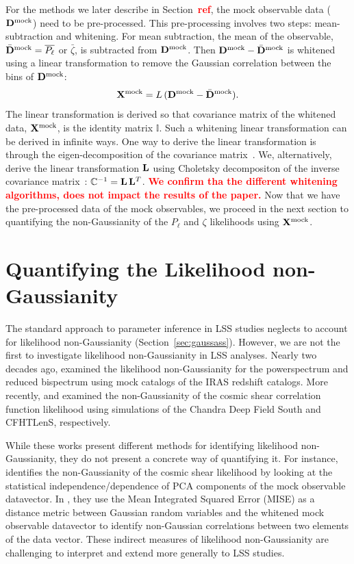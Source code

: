 \documentclass[12pt, letterpaper, preprint]{aastex}
\newcommand{\beq}{\begin{equation}}
\newcommand{\eeq}{\end{equation}}
\newcommand{\todo}[1]{{\bf \textcolor{red}{#1}}}
\newcommand{\Dmock}{{\bf D}^\mathrm{mock}}
\newcommand{\Xmock}{{\bf X}^\mathrm{mock}}
\begin{document}
For the methods we later describe in Section~\todo{ref}, the mock 
observable data ($\Dmock$) need to be pre-processed. This pre-processing
involves two steps: mean-subtraction and whitening. For mean subtraction, 
the mean of the observable, $\bar{\bf D}^\mathrm{mock} = \overline{P_\ell}$ or 
$\bar{\zeta}$, is subtracted from $\Dmock$. Then $\Dmock - \bar{\bf D}^\mathrm{mock}$ 
is whitened using a linear transformation to remove the Gaussian correlation
between the bins of $\Dmock$: 
\beq
\Xmock = L\,(\Dmock - \bar{\bf D}^\mathrm{mock}). 
\eeq
The linear transformation is derived so that covariance matrix of the whitened 
data, $\Xmock$, is the identity matrix $\mathbb{I}$. Such a whitening linear 
transformation can be derived in infinite ways. 
One way to derive the linear transformation is through the eigen-decomposition
of the covariance matrix~\citep[\emph{e.g.}][]{hartlap2009, sellentin2017}. We, alternatively, 
derive the linear transformation ${\bf L}$ using Choletsky decompositon of the 
inverse covariance matrix~\citep{Press:1992:NRC:148286}: 
$\mathbb{C}^{-1} = {\bf L}\,{\bf L}^T$. \todo{We confirm tha the different 
whitening algorithms, does not impact the results of the paper.}
Now that we have the pre-processed data of the mock observables, 
we proceed in the next section to quantifying the non-Gaussianity of the 
$P_\ell$ and $\zeta$ likelihoods using $\Xmock$. 


\section{Quantifying the Likelihood non-Gaussianity}
The standard approach to parameter inference in LSS studies neglects
to account for likelihood non-Gaussianity (Section~\ref{sec:gaussass}). 
However, we are not the first to investigate likelihood non-Gaussianity 
in LSS analyses. Nearly two decades ago, \cite{scoccimarro2000} examined 
the likelihood non-Gaussianity for the powerspectrum and reduced bispectrum 
using mock catalogs of the IRAS redshift catalogs. More recently, 
\cite{hartlap2009} and \cite{sellentin2017} examined the non-Gaussianity 
of the cosmic shear correlation function likelihood using simulations of 
the Chandra Deep Field South and CFHTLenS, respectively. 

While these works present different methods for identifying 
likelihood non-Gaussianity, they do not present a concrete way of 
quantifying it. For instance, \cite{hartlap2009} identifies the
non-Gaussianity of the cosmic shear likelihood by looking at the
statistical independence/dependence of PCA components of the mock 
observable datavector. In \cite{sellentin2017}, they use the Mean
Integrated Squared Error (MISE) as a distance metric between 
Gaussian random variables and the whitened mock observable 
datavector to identify non-Gaussian correlations between two elements 
of the data vector. These indirect measures of likelihood non-Gaussianity 
are challenging to interpret and extend more generally to LSS studies. 
\end{document}
